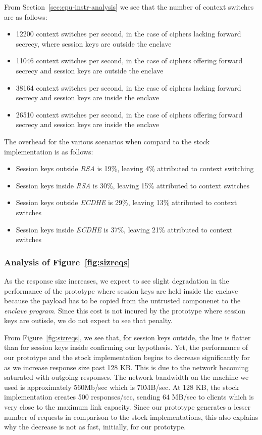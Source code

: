 \documentclass[../../../main.tex]{subfiles}
\begin{document}
From Section~\ref{sec:cpu-instr-analysis} we see that the number of
context switches are as follows:
\begin{itemize}
  \item 12200 context switches per second, in
    the case of ciphers lacking forward secrecy, where session keys are
    outside the enclave
  \item 11046 context switches per second, in the case of ciphers offering
    forward secrecy and session keys are outside the enclave
  \item 38164 context switches per second, in the case of ciphers lacking
    forward secrecy and session keys are inside the enclave
  \item 26510 context switches per second, in the case of ciphers offering
    forward secrecy and session keys are inside the enclave
\end{itemize}

The overhead for the various scenarios when compard to the stock implementation is
as follows:
\begin{itemize}
  \item Session keys outside \textit{RSA} is 19\%, leaving 4\%
    attributed to context switching
  \item Session keys inside \textit{RSA} is 30\%, leaving 15\%
    attributed to context switches
  \item Session keys outside \textit{ECDHE} is 29\%, leaving 13\%
    attributed to context switches
  \item Session keys inside \textit{ECDHE} is 37\%, leaving 21\%
    attributed to context switches
\end{itemize}

\subsubsection*{Analysis of Figure~\ref{fig:sizreqs}}
As the response size increases, we expect to see slight degradation in
the performance of the prototype where session keys are held inside
the enclave because the payload has to be copied from the untrusted
componenet to the \textit{enclave program}. Since this cost is not
incured by the prototype where session keys are outisde, we do not
expect to see that penalty.

From Figure~\ref{fig:sizreqs}, we see that, for session keys outside,
the line is flatter than for session keys inside confirming our
hypothesis. Yet, the performance of our prototype and the stock
implementation begins to decrease significantly for as we increase
response size past 128 KB. This is due to the network becoming
saturated with outgoing responses. The network bandwidth on the
machine we used is approximately 560Mb/sec which is 70MB/sec. At 128
KB, the stock implementation creates 500 responses/sec, sending 64
MB/sec to clients which is very close to the maximum link capacity.
Since our prototype generates a lesser number of requests in
comparison to the stock implementations, this also explains why the
decrease is not as fast, initially, for our prototype. 

\end{document}

